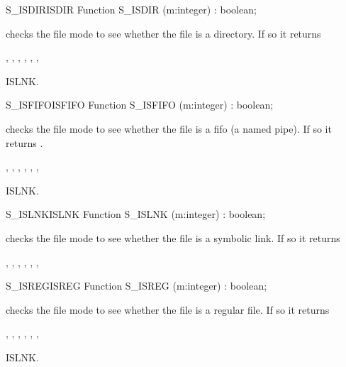 \begin{functionl}{S\_ISDIR}{ISDIR}
\Declaration
Function S\_ISDIR (m:integer) : boolean;

\Description
  checks the file mode  to see whether the file is a
directory. If so it returns 

\Errors
{},
 , 
 ,
 ,
 ,
 ,

\SeeAlso
ISLNK.
\end{functionl}
\begin{functionl}{S\_ISFIFO}{ISFIFO}
\Declaration
Function S\_ISFIFO (m:integer) : boolean;

\Description
  checks the file mode  to see whether the file is a
fifo (a named pipe). If so it returns .

\Errors
{},
 , 
 ,
 ,
 ,
 ,

\SeeAlso
ISLNK.
\end{functionl}
\begin{functionl}{S\_ISLNK}{ISLNK}
\Declaration
Function S\_ISLNK (m:integer) : boolean;

\Description
  checks the file mode  to see whether the file is a
symbolic link. If so it returns 

\Errors
{},
 ,
 ,
 ,
 ,
 ,

\SeeAlso
{}
\end{functionl}
\html{}
\begin{functionl}{S\_ISREG}{ISREG}
\Declaration
Function S\_ISREG (m:integer) : boolean;

\Description
  checks the file mode  to see whether the file is a
regular file. If so it returns 

\Errors
{},
 , 
 ,
 ,
 ,
 ,

\SeeAlso
ISLNK.
\end{functionl}
